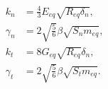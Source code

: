 \begin{equation}
\begin{aligned}
	k_n &= \frac{4}{3} E_{eq} \sqrt{R_{eq} \delta_n} ,\\
	\gamma_n &= 2 \sqrt{\frac{5}{6}} \beta \sqrt{S_n m_{eq}} ,\\
	k_t &= 8 G_{eq} \sqrt{R_{eq}} \delta_n ,\\
	\gamma_t &= 2 \sqrt{\frac{5}{6}} \beta \sqrt{S_t m_{eq}} .
\end{aligned}
\label{eq:hertz}
\end{equation}
